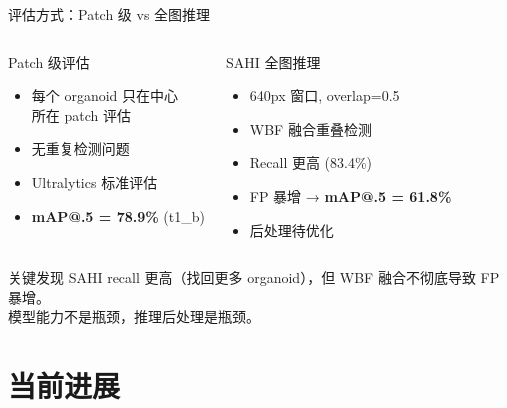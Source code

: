 \documentclass[aspectratio=169, 11pt]{beamer}
\begin{document}
\begin{frame}{评估方式：Patch 级 vs 全图推理}
  \begin{columns}[T]
    \begin{block}{Patch 级评估}
      \begin{itemize}
        \item 每个 organoid 只在中心\\所在 patch 评估
        \item 无重复检测问题
        \item Ultralytics 标准评估
        \item \textbf{mAP@.5 = 78.9\%} (t1\_b)
      \end{itemize}
    \end{block}
    \begin{block}{SAHI 全图推理}
      \begin{itemize}
        \item 640px 窗口, overlap=0.5
        \item WBF 融合重叠检测
        \item Recall 更高 (83.4\%)
        \item FP 暴增 → \textbf{mAP@.5 = 61.8\%}
        \item 后处理待优化
      \end{itemize}
    \end{block}
  \end{columns}
  \vspace{0.5em}
  \begin{alertblock}{关键发现}
    SAHI recall 更高（找回更多 organoid），但 WBF 融合不彻底导致 FP 暴增。\\
    模型能力不是瓶颈，推理后处理是瓶颈。
  \end{alertblock}
\end{frame}

\section{当前进展}
\end{document}
